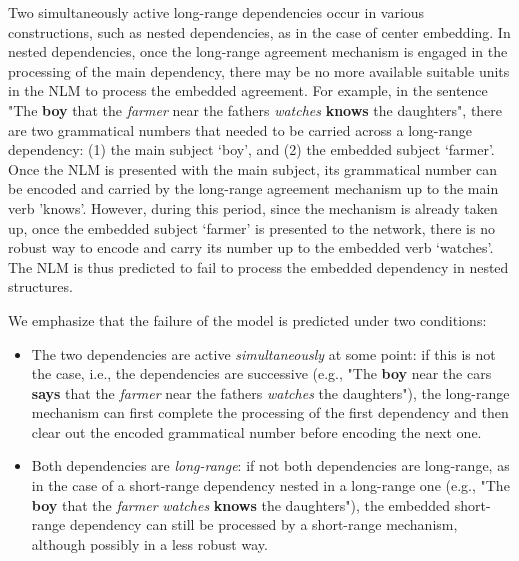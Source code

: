 Two simultaneously active long-range dependencies occur in various constructions, such as nested dependencies, as in the case of center embedding. In nested dependencies, once the long-range agreement mechanism is engaged in the processing of the main dependency, there may be no more available suitable units in the NLM to process the embedded agreement. For example, in the sentence "The \textbf{boy} that the \textit{farmer} near the fathers \textit{watches} \textbf{knows} the daughters", there are two grammatical numbers that needed to be carried across a long-range dependency: (1) the main subject `boy', and (2) the embedded subject `farmer'. Once the NLM is presented with the main subject, its grammatical number can be encoded and carried by the long-range agreement mechanism up to the main verb 'knows'. However, during this period, since the mechanism is already taken up, once the embedded subject `farmer' is presented to the network, there is no robust way to encode and carry its number up to the embedded verb `watches'. The NLM is thus predicted to fail to process the embedded dependency in nested structures.

We emphasize that the failure of the model is predicted under two conditions:
\begin{itemize}
	\item The two dependencies are active \textit{simultaneously} at some point: if this is not the case, i.e., the dependencies are successive (e.g., "The \textbf{boy} near the cars \textbf{says} that the \textit{farmer} near the fathers \textit{watches} the daughters"), the long-range mechanism can first complete the processing of the first dependency and then clear out the encoded grammatical number before encoding the next one. 

    \item Both dependencies are \textit{long-range}: if not both dependencies are long-range, as in the case of a short-range dependency nested in a long-range one (e.g., "The \textbf{boy} that the \textit{farmer} \textit{watches} \textbf{knows} the daughters"), the embedded short-range dependency can still be processed by a short-range mechanism, although possibly in a less robust way. 
\end{itemize}
